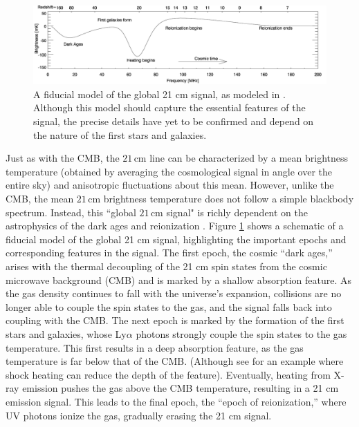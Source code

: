 \documentclass[twocolumn,apj,numberedappendix]{emulateapj}
\begin{document}
\begin{figure}[!]
	\centering
	\includegraphics[width=1.00\textwidth]{figures/fidModel.png}
	\caption{A fiducial model of the global 21 cm signal, as modeled in \citet{PritchardLoeb2010}. Although this model should capture the essential features of the signal, the precise details have yet to be confirmed and depend on the nature of the first stars and galaxies.}
	\label{fig:21cmSignal}
\end{figure}

Just as with the CMB, the $21\,\textrm{cm}$ line can be characterized by a mean brightness temperature (obtained by averaging the cosmological signal in angle over the entire sky) and anisotropic fluctuations about this mean. However, unlike the CMB, the mean $21\,\textrm{cm}$ brightness temperature does not follow a simple blackbody spectrum. Instead, this ``global $21\,\textrm{cm}$ signal" is richly dependent on the astrophysics of the dark ages and reionization \citep{Shaver1999,PritchardLoeb2010,MorandiBarkana}. Figure \ref{fig:21cmSignal} shows a schematic of a fiducial model of the global 21 cm signal, highlighting the important epochs and corresponding features in the signal. The first epoch, the cosmic ``dark ages,'' arises with the thermal decoupling of the 21 cm spin states from the cosmic microwave background (CMB) and is marked by a shallow absorption feature. As the gas density continues to fall with the universe's expansion, collisions are no longer able to couple the spin states to the gas, and the signal falls back into coupling with the CMB. The next epoch is marked by the formation of the first stars and galaxies, whose Ly$\alpha$ photons strongly couple the spin states to the gas temperature. This first results in a deep absorption feature, as the gas temperature is far below that of the CMB. (Although see \citealt{GnedinShaver2004} for an example where shock heating can reduce the depth of the feature). Eventually, heating from X-ray emission pushes the gas above the CMB temperature, resulting in a 21 cm emission signal. This leads to the final epoch, the ``epoch of reionization,'' where UV photons ionize the gas, gradually erasing the 21 cm signal.
\end{document}

